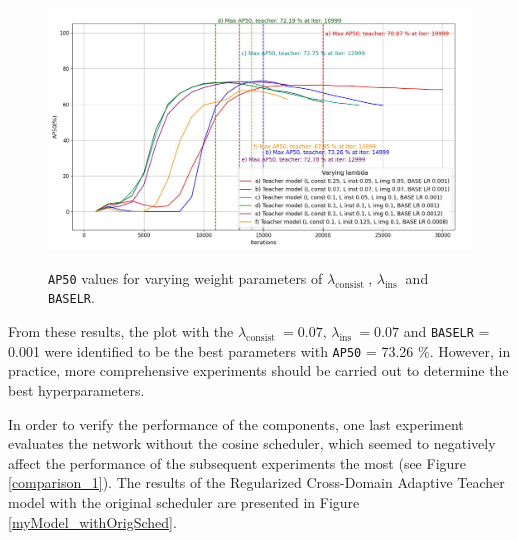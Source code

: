 \begin{figure}[htb]
	\begin{center}
		\includegraphics[width=14cm]{./AP50_varying_lambda.jpg}
	\end{center}
	\caption{\texttt{AP50} values for varying weight parameters of $\lambda_{\text {consist }}$, $\lambda_{\text {ins }}$ and \texttt{BASE\textunderscore LR}.}
	\begin{center}
		\label{myModel_varying_params}
	\end{center}
\end{figure}
\FloatBarrier  
From these results, the plot with the $\lambda_{\text {consist }} = 0.07$, $\lambda_{\text {ins }} = 0.07$ and \texttt{BASE\textunderscore LR} = 0.001 were identified to be the best parameters with \texttt{AP50} = 73.26 \%. However, in practice, more comprehensive experiments should be carried out to determine the best hyperparameters. 

In order to verify the performance of the components, one last experiment evaluates the network without the cosine scheduler, which seemed to negatively affect the performance of the subsequent experiments the most (see Figure \ref{comparison_1}). The results of the Regularized Cross-Domain Adaptive Teacher model with the original scheduler are presented in Figure \ref{myModel_withOrigSched}.

